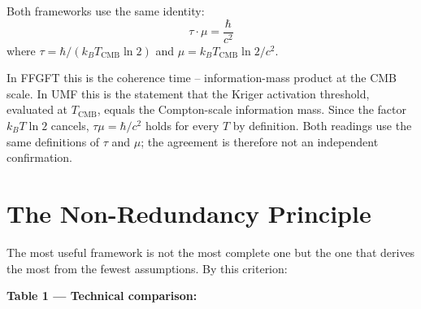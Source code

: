 Both frameworks use the same identity:
\begin{equation}
  \tau \cdot \mu = \frac{\hbar}{c^2}
  \tag{244.7}
\end{equation}
where $\tau = \hbar/(k_B T_\text{CMB}\ln 2)$ and $\mu = k_B T_\text{CMB}\ln 2/c^2$.

In FFGFT this is the coherence time -- information-mass product at the CMB scale.
In UMF this is the statement that the Kriger activation threshold, evaluated at
$T_\text{CMB}$, equals the Compton-scale information mass. Since the factor
$k_BT\ln2$ cancels, $\tau\mu = \hbar/c^2$ holds for every $T$ by definition.
Both readings use the same definitions of $\tau$ and $\mu$; the agreement is
therefore not an independent confirmation.

\section{The Non-Redundancy Principle}

The most useful framework is not the most complete one but the one that
derives the most from the fewest assumptions. By this criterion:

\textbf{Table 1 — Technical comparison:}

\begin{center}
\renewcommand{\arraystretch}{1.4}
{\small
{}
}
\end{center}

